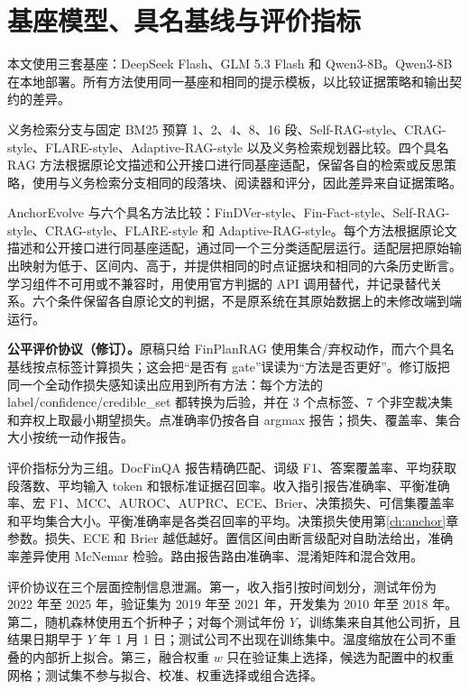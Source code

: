 \section{基座模型、具名基线与评价指标}

本文使用三套基座：DeepSeek Flash、GLM 5.3 Flash 和 Qwen3-8B\citep{qwen2025qwen3}。Qwen3-8B 在本地部署。所有方法使用同一基座和相同的提示模板，以比较证据策略和输出契约的差异。

义务检索分支与固定 BM25 预算 1、2、4、8、16 段、Self-RAG-style、CRAG-style、FLARE-style、Adaptive-RAG-style 以及义务检索规划器比较。四个具名 RAG 方法根据原论文描述和公开接口进行同基座适配，保留各自的检索或反思策略，使用与义务检索分支相同的段落块、阅读器和评分，因此差异来自证据策略。

AnchorEvolve 与六个具名方法比较：FinDVer-style\citep{zhao2024findver}、Fin-Fact-style\citep{rangapur2025finfact}、Self-RAG-style\citep{asai2024selfrag}、CRAG-style\citep{yan2024crag}、FLARE-style\citep{jiang2023flare} 和 Adaptive-RAG-style\citep{jeong2024adaptiverag}。每个方法根据原论文描述和公开接口进行同基座适配，通过同一个三分类适配层运行。适配层把原始输出映射为低于、区间内、高于，并提供相同的时点证据块和相同的六条历史断言。学习组件不可用或不兼容时，用使用官方判据的 API 调用替代，并记录替代关系。六个条件保留各自原论文的判据，不是原系统在其原始数据上的未修改端到端运行。

\begin{revbox}
\noindent\textbf{公平评价协议（修订）。}原稿只给 FinPlanRAG 使用集合/弃权动作，而六个具名基线按点标签计算损失；这会把“是否有 gate”误读为“方法是否更好”。修订版把同一个全动作损失感知读出应用到所有方法：每个方法的 label/confidence/credible\_set 都转换为后验，并在 3 个点标签、7 个非空裁决集和弃权上取最小期望损失。点准确率仍按各自 argmax 报告；损失、覆盖率、集合大小按统一动作报告。
\end{revbox}

评价指标分为三组。DocFinQA 报告精确匹配、词级 F1、答案覆盖率、平均获取段落数、平均输入 token 和银标准证据召回率。收入指引报告准确率、平衡准确率、宏 F1、MCC、AUROC、AUPRC、ECE、Brier、决策损失、可信集覆盖率和平均集合大小。平衡准确率是各类召回率的平均\citep{brodersen2010balanced,sokolova2009performance}。决策损失使用第\ref{ch:anchor}章参数。损失、ECE 和 Brier 越低越好。置信区间由断言级配对自助法给出，准确率差异使用 McNemar 检验。路由报告路由准确率、混淆矩阵和混合效用。

评价协议在三个层面控制信息泄漏。第一，收入指引按时间划分，测试年份为 2022 年至 2025 年，验证集为 2019 年至 2021 年，开发集为 2010 年至 2018 年。第二，随机森林使用五个折种子；对每个测试年份 $Y$，训练集来自其他公司折，且结果日期早于 $Y$ 年 1 月 1 日；测试公司不出现在训练集中。温度缩放在公司不重叠的内部折上拟合。第三，融合权重 $w$ 只在验证集上选择，候选为配置中的权重网格；测试集不参与拟合、校准、权重选择或组合选择。

